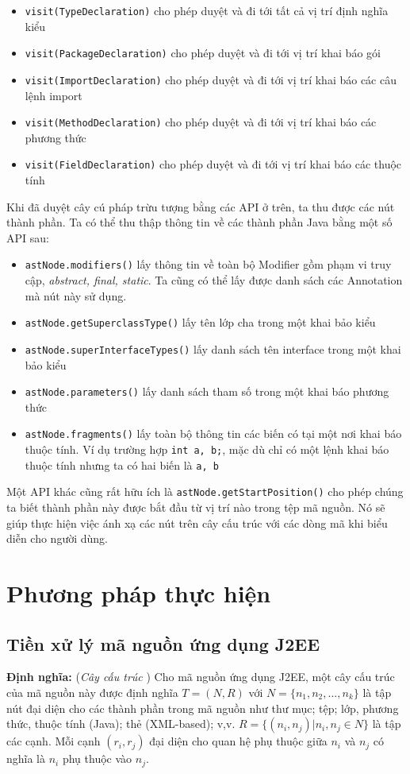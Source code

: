 \documentclass[12pt]{report}
\begin{document}
\begin{itemize}
	\item \texttt{visit(TypeDeclaration)} cho phép duyệt và đi tới tất cả vị trí định nghĩa kiểu
	\item \texttt{visit(PackageDeclaration)} cho phép duyệt và đi tới vị trí khai báo gói
	\item \texttt{visit(ImportDeclaration)} cho phép duyệt và đi tới vị trí khai báo các câu lệnh import
	\item \texttt{visit(MethodDeclaration)} cho phép duyệt và đi tới vị trí khai báo các phương thức
	\item \texttt{visit(FieldDeclaration)} cho phép duyệt và đi tới vị trí khai báo các thuộc tính
\end{itemize}

Khi đã duyệt cây cú pháp trừu tượng bằng các API ở trên, ta thu được các nút thành phần. Ta có thể thu thập thông tin về các thành phần Java bằng một số API sau:
\begin{itemize}
	\item \texttt{astNode.modifiers()} lấy thông tin về toàn bộ Modifier gồm phạm vi truy cập, \textit{abstract, final, static}. Ta cũng có thể lấy được danh sách các Annotation mà nút này sử dụng.
	\item \texttt{astNode.getSuperclassType()} lấy tên lớp cha trong một khai bảo kiểu
	\item \texttt{astNode.superInterfaceTypes()} lấy danh sách tên interface trong một khai bảo kiểu
	\item \texttt{astNode.parameters()} lấy danh sách tham số trong một khai báo phương thức
	\item \texttt{astNode.fragments()} lấy toàn bộ thông tin các biến có tại một nơi khai báo thuộc tính. Ví dụ trường hợp \texttt{int a, b;}, mặc dù chỉ có một lệnh khai báo thuộc tính nhưng ta có hai biến là \texttt{a, b}
\end{itemize}

Một API khác cũng rất hữu ích là \texttt{astNode.getStartPosition()} cho phép chúng ta biết thành phần này được bắt đầu từ vị trí nào trong tệp mã nguồn. Nó sẽ giúp thực hiện việc ánh xạ các nút trên cây cấu trúc với các dòng mã khi biểu diễn cho người dùng.

\newpage
\chapter{Phương pháp thực hiện}
\label{chap:approach}
\section{Tiền xử lý mã nguồn ứng dụng J2EE}
\textbf{Định nghĩa:} (\textit{Cây cấu trúc} \cite{jcia}) Cho mã nguồn ứng dụng J2EE, một cây cấu trúc của mã nguồn này được định nghĩa $T = (N, R)$ với $N = \{n_1, n_2,..., n_k\}$ là tập nút đại diện cho các thành phần trong mã nguồn như thư mục; tệp; lớp, phương thức, thuộc tính (Java); thẻ (XML-based); v,v. $R = \{(n_i, n_j) | n_i,n_j \in N\}$ là tập các cạnh. Mỗi cạnh $(r_i,r_j)$ đại diện cho quan hệ phụ thuộc giữa $n_i$ và $n_j$ có nghĩa là $n_i$ phụ thuộc vào $n_j$.
\end{document}
